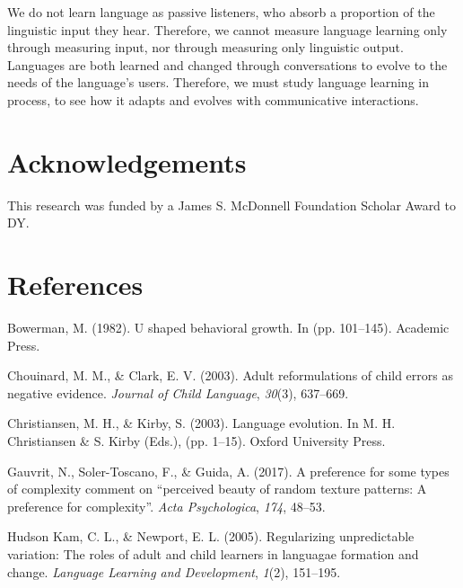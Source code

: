 \documentclass[10pt, letterpaper]{article}
\begin{document}
We do not learn language as passive listeners, who absorb a proportion
of the linguistic input they hear. Therefore, we cannot measure language
learning only through measuring input, nor through measuring only
linguistic output. Languages are both learned and changed through
conversations to evolve to the needs of the language's users. Therefore,
we must study language learning in process, to see how it adapts and
evolves with communicative interactions.

\vspace{1em}

\section{Acknowledgements}\label{acknowledgements}

This research was funded by a James S. McDonnell Foundation Scholar
Award to DY.

\section{References}\label{references}

\setlength{\parindent}{-0.1in} \setlength{\leftskip}{0.125in}

\noindent

\hypertarget{refs}{}
\hypertarget{ref-bowerman-1982}{}
Bowerman, M. (1982). U shaped behavioral growth. In (pp. 101--145).
Academic Press.

\hypertarget{ref-chouinard-2003}{}
Chouinard, M. M., \& Clark, E. V. (2003). Adult reformulations of child
errors as negative evidence. \emph{Journal of Child Language},
\emph{30}(3), 637--669.

\hypertarget{ref-christiansen-2003}{}
Christiansen, M. H., \& Kirby, S. (2003). Language evolution. In M. H.
Christiansen \& S. Kirby (Eds.), (pp. 1--15). Oxford University Press.

\hypertarget{ref-gauvrit-2017}{}
Gauvrit, N., Soler-Toscano, F., \& Guida, A. (2017). A preference for
some types of complexity comment on ``perceived beauty of random texture
patterns: A preference for complexity''. \emph{Acta Psychologica},
\emph{174}, 48--53.

\hypertarget{ref-hudsonkam-2005}{}
Hudson Kam, C. L., \& Newport, E. L. (2005). Regularizing unpredictable
variation: The roles of adult and child learners in languagae formation
and change. \emph{Language Learning and Development}, \emph{1}(2),
151--195.
\end{document}
